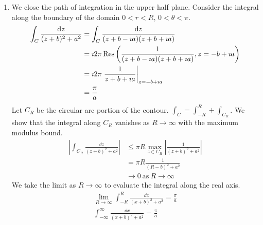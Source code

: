 {\begin{Solution}
\begin{enumerate}
    We take the limit as $R \to \infty$ to evaluate the integral along the 
    real axis.
    \begin{gather*}
      \lim_{R \to \infty} \frac{1}{2} \int_{-R}^R \frac{x^2}{(x^2 + 1) (x^2 + 4)}\,\dd x 
      = \frac{\pi}{6}
      \\
      \int_0^\infty \frac{x^2}{(x^2 + 1) (x^2 + 4)}\,\dd x = \frac{\pi}{6}
    \end{gather*}
  \item 
    We close the path of integration in the upper half plane.
    Consider the integral along the boundary of the domain $0 < r < R$,
    $0 < \theta < \pi$.  
    \begin{align*}
      \int_C \frac{\mathrm{d} z}{(z + b)^2 + a^2}
      &= \int_C \frac{\mathrm{d} z}{(z + b - \imath a) (z + b + \imath a)}
      \\
      &= \imath 2 \pi \mathop{\mathrm{Res}}\nolimits \left( \frac{1}{(z + b - \imath a) (z + b + \imath a)}, 
        z = -b + \imath a \right)
      \\
      &= \imath 2 \pi \left. \frac{1}{z + b + \imath a} \right|_{z = -b + \imath a}
      \\
      &= \frac{\pi}{a}
    \end{align*}
    Let $C_R$ be the circular arc portion of the contour. $\int_C = \int_{-R}^R + \int_{C_R}$.
    We show that the integral along $C_R$ vanishes as $R \to \infty$ with the 
    maximum modulus bound.
    \begin{align*}
      \left| \int_{C_R} \frac{\dd z}{(z + b)^2 + a^2} \right|
      &\leq \pi R \max_{z \in C_R} \left|  \frac{1}{(z + b)^2 + a^2} \right|
      \\
      &= \pi R \frac{1}{(R - b)^2 + a^2}
      \\
      &\to 0\ \mathrm{as}\ R \to \infty
    \end{align*}
    We take the limit as $R \to \infty$ to evaluate the integral along the 
    real axis.
    \begin{gather*}
      \lim_{R \to \infty} \int_{-R}^R \frac{\dd x}{(x + b)^2 + a^2} = \frac{\pi}{a}
      \\
      \int_{-\infty}^\infty \frac{\dd x}{(x + b)^2 + a^2} = \frac{\pi}{a}
    \end{gather*}
  \end{enumerate}
\end{Solution}









}
